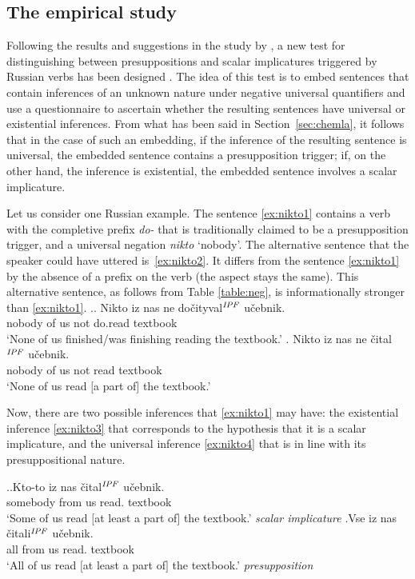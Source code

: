 \subsection{The empirical study}\label{empirical}
Following the results and suggestions in the study by \citet{Chemla:09}, a new test for distinguishing between presuppositions and scalar implicatures triggered by Russian verbs has been designed \citep{ZinovaFilip:SALT}. The idea of this test is to embed sentences that contain inferences of an unknown nature under negative universal quantifiers and use a questionnaire to ascertain whether the resulting sentences have universal or existential inferences. From what has been said in Section~\ref{sec:chemla}, it follows that in the case of such an embedding, if the inference of the resulting sentence is universal, the embedded sentence contains a presupposition trigger; if, on the other hand, the inference is existential, the embedded sentence involves a scalar implicature.

Let us consider one Russian example. The sentence \ref{ex:nikto1} contains a verb with the completive prefix \textit{do-} that is traditionally claimed to be a presupposition trigger, and a universal negation \textit{nikto} `nobody'. The alternative sentence that the speaker could have uttered is~\ref{ex:nikto2}. It differs from the sentence \ref{ex:nikto1} by the absence of a prefix on the verb (the aspect stays the same). This alternative sentence, as follows from Table \ref{table:neg}, is informationally stronger than \ref{ex:nikto1}.
\ex.\label{ex:nikto}\ag. \label{ex:nikto1}Nikto iz nas ne do\v{c}ityval$^{\mathit{IPF}}$ u\v{c}ebnik.\\
nobody of us not do.read textbook\\
 `None of us finished/was finishing reading the textbook.'
\bg. \label{ex:nikto2}Nikto iz nas ne \v{c}ital$^{\mathit{IPF}}$ u\v{c}ebnik.\\
nobody of us not read textbook\\
 `None of us read $[$a part of$]$ the textbook.'

Now, there are two possible inferences that \ref{ex:nikto1} may have: the existential inference \ref{ex:nikto3} that corresponds to the hypothesis that it is a scalar implicature, and the universal inference \ref{ex:nikto4} that is in line with its presuppositional nature.

\ex.\ag.\label{ex:nikto3}Kto-to iz nas \v{c}ital$^{\mathit{IPF}}$ u\v{c}ebnik.\\
somebody from us read. textbook\\
`Some of us read $[$at least a part of$]$ the textbook.' \hfill \textit{scalar implicature}
\bg.\label{ex:nikto4}Vse iz nas \v{c}itali$^{\mathit{IPF}}$ u\v{c}ebnik.\\
all from us read. textbook\\
`All of us read $[$at least a part of$]$ the textbook.' \hfill \textit{presupposition}

